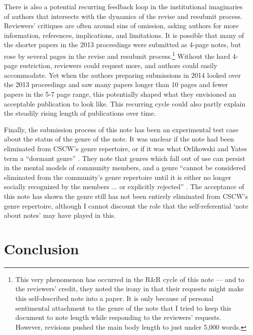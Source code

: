 \documentclass[format=acmsmall, screen=true]{acmart}
\begin{document}
There is also a potential recurring feedback loop in the institutional imaginaries of authors that intersects with the dynamics of the revise and resubmit process. Reviewers' critiques are often around sins of omission, asking authors for more information, references, implications, and limitations. It is possible that many of the shorter papers in the 2013 proceedings were submitted as 4-page notes, but rose by several pages in the revise and resubmit process.\footnote{This very phenomenon has occurred in the R\&R cycle of this note --- and to the reviewers' credit, they noted the irony in that their requests might make this self-described note into a paper. It is only because of personal sentimental attachment to the genre of the note that I tried to keep this document to note length while responding to the reviewers' requests. However, revisions pushed the main body length to just under 5,000 words.} Without the hard 4-page restriction, reviewers could request more, and authors could easily accommodate. Yet when the authors preparing submissions in 2014 looked over the 2013 proceedings and saw many papers longer than 10 pages and fewer papers in the 5-7 page range, this potentially shaped what they envisioned an acceptable publication to look like. This recurring cycle could also partly explain the steadily rising length of publications over time.

Finally, the submission process of this note has been an experimental test case about the status of the genre of the note. It was unclear if the note had been eliminated from CSCW's genre repertoire, or if it was what Orlikowski and Yates term a ``dormant genre'' \cite{orlikowski_genre_1994}. They note that genres which fall out of use can persist in the mental models of community members, and a genre ``cannot be considered eliminated from the community's genre repertoire until it is either no longer socially recognized by the members ... or explicitly rejected'' \cite[p.549]{orlikowski_genre_1994}. The acceptance of this note has shown the genre still has not been entirely eliminated from CSCW's genre repertoire, although I cannot discount the role that the self-referential `note about notes' may have played in this. 

\section{Conclusion}
\end{document}
